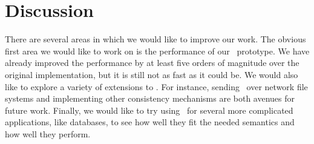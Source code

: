 \section {Discussion}
\label{sec:discussion}

There are several areas in which we would like to improve our work. The obvious
first area we would like to work on is the performance of our \Kudos\ prototype.
%
We have already improved the performance by at least five orders of magnitude
over the original implementation, but it is still not as fast as it could be.
%
We would also like to explore a variety of extensions to \Kudos. For instance,
sending \patches\ over network file systems and implementing other consistency
mechanisms are both avenues for future work.
%
Finally, we would like to try using \patchgroups\ for several more complicated
applications, like databases, to see how well they fit the needed semantics and
how well they perform.


\begin{comment}
While the original inspiration for \patches\ came from soft updates, we came to
like journals more and more compared to soft updates while we developed \Kudos.
%
Disks have several properties which contribute to this unexpected reversal.
First, they are very much not random access devices: seeking is expensive, and
even when I/O requests are consecutive, the very number of I/O requests turns
out to be a bottleneck.
%
Additionally, few disks actually guarantee to write blocks atomically: it is
entirely possible for the value of a block to be neither the original nor the
new value if a crash occurs while it is being written.


Soft updates requires this second guarantee, and it performs much better when
the seeking and additional I/O requests it does to write metadata are
comparatively inexpensive.
%
Journaling, on the other hand, allows adjacent I/O requrests to be batched
easily, and it does not require the atomic block write guarantee.
%
Even though it can write up to twice as much data, due to the different I/O
behavior it may even take less time to write it than soft updates would take for
half as much data.
%
As disks get larger and sustained I/O speeds increase faster than seek times or
I/O bus round trip times, the surprising result is that journaling is looking
better and better compared to soft updates.
\end{comment}
